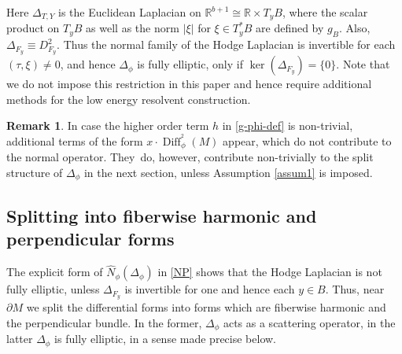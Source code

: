 \documentclass[11pt]{article}
\numberwithin{equation}{section}
\theoremstyle{plain}
\theoremstyle{definition}
\newtheorem{Rem}[Th]{Remark}
\newcommand{\R}{{\mathbb{R}}}
\DeclareMathOperator{\Diff}{Diff}
\begin{document}
Here $\Delta_{T,Y}$ is the Euclidean Laplacian on $\R^{b+1}\cong\R\times T_yB$, where the scalar product on $T_yB$ as well as the norm $ \vert \xi\vert$ for $\xi\in T^*_{y}B$ are defined by $g_B$. Also, $\Delta_{F_y} \equiv D^2_{F_y}$.
Thus the normal family of the Hodge Laplacian is invertible for each $(\tau,\xi) \neq 0$,
and hence $\Delta_{\phi}$ is fully elliptic, only if $\ker(\Delta_{F_y}) = \{0\}$. Note that we do not
impose this restriction in this paper and hence require additional methods for the low energy resolvent construction.

\begin{Rem}
In case the higher order term $h$ in \eqref{g-phi-def}
is non-trivial, additional terms of the form $x\cdot \Diff^{^2}_{\phi}(M)$
appear, which do not contribute to the normal operator. They~do, however,
contribute non-trivially to the split structure of $\Delta_{\phi}$ in the next section,
unless Assumption \ref{assum1} is imposed.
\end{Rem}

\subsection{Splitting into fiberwise harmonic and perpendicular forms}

The explicit form of $\widehat{N}_\phi(\Delta_{\phi})$ in \eqref{NP} shows that the
Hodge Laplacian is not fully elliptic, unless $\Delta_{F_y}$ is invertible for one and hence each $y\in B$. Thus,
near $\partial M$ we split the differential forms into forms which are fiberwise harmonic and
the perpendicular bundle. In the former, $\Delta_{\phi}$
acts as a scattering operator, in the latter $\Delta_{\phi}$ is fully elliptic, in a sense made precise below.
\end{document}

